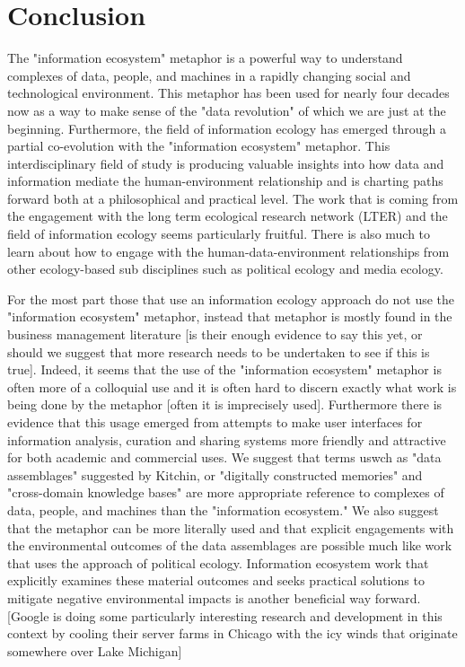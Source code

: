 \section{Conclusion}

The "information ecosystem" metaphor is a powerful way to understand complexes of data, people, and machines in a rapidly changing social and technological environment. This metaphor has been used for nearly four decades now as a way to make sense of the "data revolution" of which we are just at the beginning. Furthermore, the field of information ecology has emerged through a partial co-evolution with the "information ecosystem" metaphor. This interdisciplinary field of study is producing valuable insights into how data and information mediate the human-environment relationship and is charting paths forward both at a philosophical and practical level. The work that is coming from the engagement with the long term ecological research network (LTER) and the field of information ecology seems particularly fruitful. There is also much to learn about how to engage with the human-data-environment relationships from other ecology-based sub disciplines such as political ecology and media ecology. 

For the most part those that use an information ecology approach do not use the "information ecosystem" metaphor, instead that metaphor is mostly found in the business management literature [is their enough evidence to say this yet, or should we suggest that more research needs to be undertaken to see if this is true]. Indeed, it seems that the use of the "information ecosystem" metaphor is often more of a colloquial use and it is often hard to discern exactly what work is being done by the metaphor [often it is imprecisely used]. Furthermore there is evidence that this usage emerged from attempts to make user interfaces for information analysis, curation and sharing systems more friendly and attractive for both academic and commercial uses. We suggest that terms uswch as "data assemblages" suggested by Kitchin, or "digitally constructed memories" and "cross-domain knowledge bases" \citep{baker_2007} are more appropriate reference to complexes of data, people, and machines than the "information ecosystem." We also suggest that the metaphor can be more literally used and that explicit engagements with the environmental outcomes of the data assemblages are possible much like work that uses the approach of political ecology. Information ecosystem work that explicitly examines these material outcomes and seeks practical solutions to mitigate negative environmental impacts is another beneficial way forward. [Google is doing some particularly interesting research and development in this context by cooling their server farms in Chicago with the icy winds that originate somewhere over Lake Michigan]

